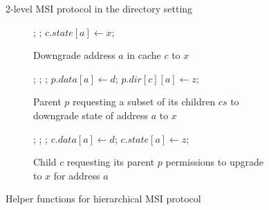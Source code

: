 \begin{figure}
\caption{2-level MSI protocol in the directory setting}
\label{msidir}
\end{figure}

\begin{figure}

\begin{subfigure}{\linewidth}
\begin{boxedminipage}{\linewidth}
\begin{algorithmic}
    \State \send{} ;
      \State \send{} ;
    \EndIf
    \State $c.state[a] \gets x$;
  \EndIf
\EndProc
\end{algorithmic}
\end{boxedminipage}
\caption{Downgrade address $a$ in cache $c$ to $x$}
\label{downgrade}
\end{subfigure}

\begin{subfigure}{\linewidth}
\begin{boxedminipage}{\linewidth}
\begin{algorithmic}
    \State \send{} ;
    \State \receive{} ;
      \State \receive{} ;
      \State $p.data[a] \gets d$;
    \EndIf
    \State $p.dir[c][a] \gets z$;
  \EndFor
\EndProc
\end{algorithmic}
\end{boxedminipage}
\caption{Parent $p$ requesting a subset of its children $cs$ to downgrade state
of address $a$ to $x$}
\label{downgrademany}
\end{subfigure}

\begin{subfigure}{\linewidth}
\begin{boxedminipage}{\linewidth}
\begin{algorithmic}
    \State \send{} ;
    \State \receive{} ;
      \State \receive{} ;
      \State $c.data[a] \gets d$;
    \EndIf
    \State $c.state[a] \gets z$;
  \EndIf
\EndProc
\end{algorithmic}
\end{boxedminipage}
\caption{Child $c$ requesting its parent $p$ permissions to upgrade to $x$ for
address $a$}
\label{upgrade}
\end{subfigure}

\caption{Helper functions for hierarchical MSI protocol}
\label{multihelper}
\end{figure}

